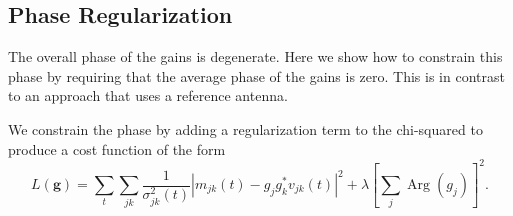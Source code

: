 \documentclass{article}
\begin{document}
\subsection{Phase Regularization}
\label{s:phase_regularization}

The overall phase of the gains is degenerate. Here we show how to constrain this phase by requiring that the average phase of the gains is zero. This is in contrast to an approach that uses a reference antenna.

We constrain the phase by adding a regularization term to the chi-squared to produce a cost function of the form
\begin{equation}
    L(\boldsymbol{g}) = \sum_t \sum_{jk} \frac{1}{\sigma_{jk}^2(t)} \left| m_{jk}(t) - g_j g_k^* v_{jk}(t) \right|^2 + \lambda \left[ \sum_j \operatorname{Arg}(g_j) \right]^2.
\end{equation}
\end{document}
